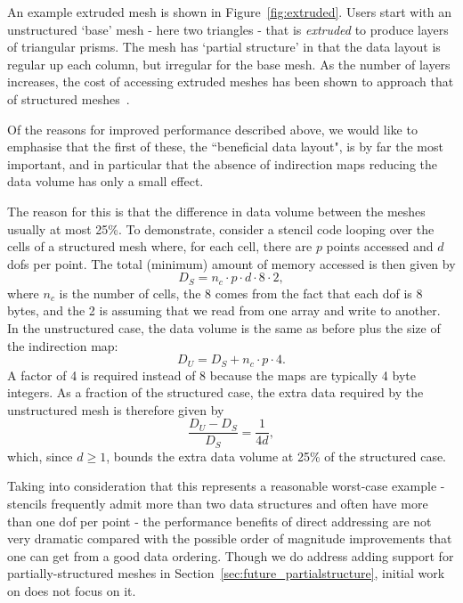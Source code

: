 An example extruded mesh is shown in Figure~\ref{fig:extruded}.
Users start with an unstructured `base' mesh - here two triangles - that is \textit{extruded} to produce layers of triangular prisms.
The mesh has `partial structure' in that the data layout is regular up each column, but irregular for the base mesh.
As the number of layers increases, the cost of accessing extruded meshes has been shown to approach that of structured meshes~\cite{berceaStructureexploitingNumberingAlgorithm2016}.

Of the reasons for improved performance described above, we would like to emphasise that the first of these, the ``beneficial data layout", is by far the most important, and in particular that the absence of indirection maps reducing the data volume has only a small effect.

The reason for this is that the difference in data volume between the meshes usually at most 25\%.
To demonstrate, consider a stencil code looping over the cells of a structured mesh where, for each cell, there are $p$ points accessed and $d$ \glspl{dof} per point.
The total (minimum) amount of memory accessed is then given by
\begin{equation*}
  D_S = n_c \cdot p \cdot d \cdot 8 \cdot 2,
\end{equation*}
where $n_c$ is the number of cells, the 8 comes from the fact that each \gls{dof} is 8 bytes, and the 2 is assuming that we read from one array and write to another.
In the unstructured case, the data volume is the same as before plus the size of the indirection map:
\begin{equation*}
  D_U = D_S + n_c \cdot p \cdot 4.
\end{equation*}
A factor of 4 is required instead of 8 because the maps are typically 4 byte integers.
As a fraction of the structured case, the extra data required by the unstructured mesh is therefore given by
\begin{equation*}
  \frac{D_U - D_S}{D_S} = \frac{1}{4d},
\end{equation*}
which, since $d \geq 1$, bounds the extra data volume at 25\% of the structured case.

Taking into consideration that this represents a reasonable worst-case example - stencils frequently admit more than two data structures and often have more than one \gls{dof} per point - the performance benefits of direct addressing are not very dramatic compared with the possible order of magnitude improvements that one can get from a good data ordering.
Though we do address adding support for partially-structured meshes in Section~\ref{sec:future_partialstructure}, initial work on  does not focus on it.

